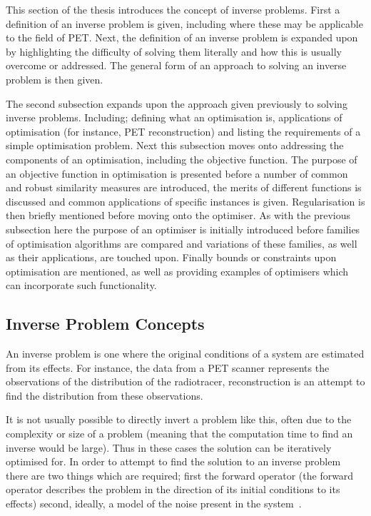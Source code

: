        This section of the thesis introduces the concept of inverse problems. First a definition of an inverse problem is given, including where these may be applicable to the field of \gls{PET}. Next, the definition of an inverse problem is expanded upon by highlighting the difficulty of solving them literally and how this is usually overcome or addressed. The general form of an approach to solving an inverse problem is then given.
            
        The second subsection expands upon the approach given previously to solving inverse problems. Including; defining what an optimisation is, applications of optimisation (for instance, \gls{PET} reconstruction) and listing the requirements of a simple optimisation problem. Next this subsection moves onto addressing the components of an optimisation, including the objective function. The purpose of an objective function in optimisation is presented before a number of common and robust similarity measures are introduced, the merits of different functions is discussed and common applications of specific instances is given. Regularisation is then briefly mentioned before moving onto the optimiser. As with the previous subsection here the purpose of an optimiser is initially introduced before families of optimisation algorithms are compared and variations of these families, as well as their applications, are touched upon. Finally bounds or constraints upon optimisation are mentioned, as well as providing examples of optimisers which can incorporate such functionality.
        
        \subsection{Inverse Problem Concepts} \label{sec:inverse_problem_concepts}
            An inverse problem is one where the original conditions of a system are estimated from its effects. For instance, the data from a \gls{PET} scanner represents the observations of the distribution of the radiotracer, reconstruction is an attempt to find the distribution from these observations.
            
            It is not usually possible to directly invert a problem like this, often due to the complexity or size of a problem (meaning that  the computation time to find an inverse would be large). Thus in these cases the solution can be iteratively optimised for. In order to attempt to find the solution to an inverse problem there are two things which are required; first the forward operator (the forward operator describes the problem in the direction of its initial conditions to its effects) %
            second, ideally, a model of the noise present in the system~\parencite{Brusaferri2020ImprovingInformation, Emond2020ImprovingEffectiveness}. %
        
